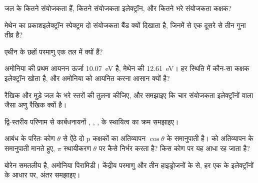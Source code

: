 \begin{exercise}[$\star$]\label{exo:b2:fragment-orbitals:2}
जल के कितने संयोजकता  हैं, कितने संयोजकता इलेक्ट्रॉन,
और कितने भरे संयोजकता कक्षक?
\end{exercise}

\begin{exercise}[$\star$]\label{exo:b2:fragment-orbitals:3}
मेथेन का प्रकाशइलेक्ट्रॉन स्पेक्ट्रम दो संयोजकता बैंड क्यों दिखाता है, जिनमें से एक
दूसरे से तीन गुना तीव्र है?
\end{exercise}

\begin{exercise}[$\star$]\label{exo:b2:fragment-orbitals:4}
एथीन के छहों परमाणु एक तल में क्यों हैं?
\end{exercise}

\begin{exercise}[$\star\star$]\label{exo:b2:fragment-orbitals:5}
अमोनिया की प्रथम आयनन ऊर्जा \qty{10.07}{eV} है, मेथेन की
\qty{12.61}{eV}। हर स्थिति में कौन-सा कक्षक इलेक्ट्रॉन खोता है, और अमोनिया को आयनित करना
आसान क्यों है?
\end{exercise}

\begin{exercise}[$\star\star$]\label{exo:b2:fragment-orbitals:6}
रैखिक और मुड़े जल के भरे स्तरों की तुलना कीजिए, और समझाइए कि चार संयोजकता इलेक्ट्रॉनों वाला
 जैसा अणु रैखिक क्यों है।
\end{exercise}

\begin{exercise}[$\star\star$]\label{exo:b2:fragment-orbitals:7}
द्वि-स्तरीय परिणाम से कार्बधनायनों
, , ,  के स्थायित्व का क्रम समझाइए।
\end{exercise}

\begin{exercise}[$\star\star$]\label{exo:b2:fragment-orbitals:8}
आबंध के परितः कोण $\theta$ से ऐंठे दो p कक्षकों का अतिव्यापन
$\cos\theta$ के समानुपाती है।  को अतिव्यापन के समानुपाती मानते हुए,
$\pi$ स्थायीकरण $\theta$ पर कैसे निर्भर करता है? किस कोण पर यह
आधा रह जाता है?
\end{exercise}

\begin{exercise}[$\star\star$]\label{exo:b2:fragment-orbitals:9}
बोरेन  समतलीय है, अमोनिया पिरामिडी। केंद्रीय परमाणु और तीन हाइड्रोजनों के
 से, हर एक के इलेक्ट्रॉनों के आधार पर, अंतर समझाइए।
\end{exercise}


